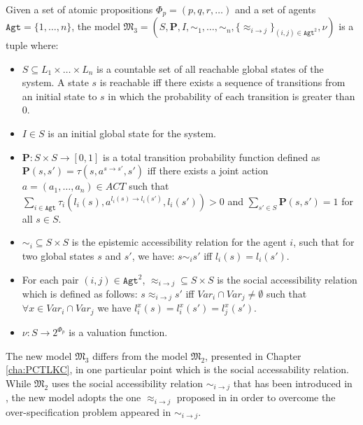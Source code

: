 \begin{definition}  ~\label{dfn:Models}

\noindent Given a set of atomic propositions $\Phi_p = (p,q,r, \ldots)$ and a set of agents $\texttt{Agt}=\{1,\ldots,n\}$,  the model $\mathfrak{M_3}=(S,\textbf{P},I,\sim_1, \ldots
,\sim_n,\{\approx_{i \rightarrow j}\}_{{(i,j)}\in \texttt{Agt}^2},\nu)$ is a tuple where:
%
\begin{itemize}
\item  $S \subseteq L_1 \times \ldots \times L_n$ is a countable set of all reachable global states of the system. A state $s$ is reachable iff there exists a sequence of transitions from an initial state to $s$ in which the probability of each transition is greater than $0$.

\item  $I \in S$ is an initial global state for the system.


\item  $\textbf{P}:S\times S\rightarrow [0,1]$ is a total transition probability function defined as $\textbf{P}(s, s')=\tau(s,a^{s \rightarrow s'}, s')$ iff there exists a joint action $a=(a_1,\ldots,a_n) \in ACT$ such that\\
     $\sum_{i \in \texttt{Agt}} \tau_i(l_i(s),a^{l_i(s)\rightarrow l_i(s')},l_i(s')) > 0$ and $\sum_{s' \in S} \textbf{P}(s,s') =1$ for all $s \in S$.

\item  $\sim_i \subseteq S \times S$ is the epistemic accessibility relation for the agent $i$, such that for two global states $s$ and $s'$, we have: $s \sim_i s'$ iff $l_i(s)=l_i(s')$.

\item For each pair $(i,j) \in \texttt{Agt}^2$, $\approx_{i\rightarrow j} \subseteq S \times S$ is the social accessibility relation which is defined as follows: $ s \approx_{i\rightarrow j} s' $ iff $ Var_i \cap Var_j \neq \emptyset $ such that $ \forall x \in Var_i \cap Var_j $ we have $ l_i^x(s) = l_i^x(s') = l_j^x(s')$.

\item  $\nu : S \rightarrow 2 ^{\Phi_p} $ is a valuation function.

\end{itemize}
\end{definition}
%

The new model $\mathfrak{M_3}$ differs from the model $\mathfrak{M_2}$,  presented in Chapter \ref{cha:PCTLKC}, in one particular point which is the social accessability relation. While $\mathfrak{M_2}$ uses the social accessibility relation $\sim_{i\rightarrow j}$ that has been introduced in \cite{Bentahar2012,El-Menshawy2013a}, the new model adopts the one $\approx_{i\rightarrow j}$ proposed in \cite{Al-Saqqar2014a} in order to overcome the over-specification problem appeared in $\sim_{i\rightarrow j}$.



